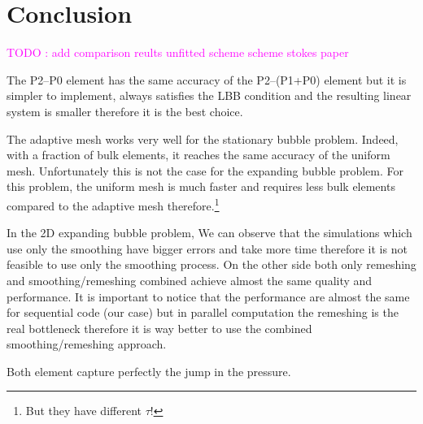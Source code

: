 \documentclass[a4paper,12pt,onecolumn]{article}
\begin{document}
\section{Conclusion}\label{sec:conclusion}
\textcolor{magenta}{TODO : add comparison reults unfitted scheme scheme stokes paper}

The P2--P0 element has the same accuracy of the P2--(P1+P0) element but it is simpler to implement, always satisfies the LBB condition and the resulting linear system is smaller therefore it is the best choice.

The adaptive mesh works very well for the stationary bubble problem. Indeed, with a fraction of bulk elements, it reaches the same accuracy of the uniform mesh. Unfortunately this is not the case for the expanding bubble problem. For this problem, the uniform mesh is much faster and requires less bulk elements compared to the adaptive mesh therefore.\footnote{But they have different $\tau$!}

In the 2D expanding bubble problem, We can observe that the simulations which use only the smoothing have bigger errors and take more time therefore it is not feasible to use only the smoothing process. On the other side both only remeshing and smoothing/remeshing combined achieve almost the same quality and performance. It is important to notice that the performance are almost the same for sequential code (our case) but in parallel computation the remeshing is the real bottleneck therefore it is way better to use the combined smoothing/remeshing approach.

Both element capture perfectly the jump in the pressure.
\newpage
 

\end{document}
